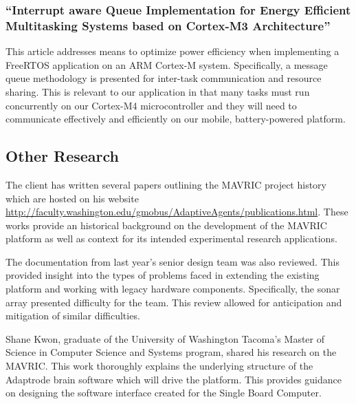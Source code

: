 \documentclass{article}
\begin{document}
            \subsubsection{``Interrupt aware Queue Implementation
            for Energy Efficient Multitasking Systems based
            on Cortex-M3 Architecture''
            \cite{cortex}}

                This article addresses means to optimize power efficiency
                when implementing a FreeRTOS application on an ARM Cortex-M system.
                Specifically, a message queue methodology is presented
                for inter-task communication and resource sharing.
                This is relevant to our application
                in that many tasks must run concurrently
                on our Cortex-M4 microcontroller
                and they will need to communicate effectively
                and efficiently on our mobile, battery-powered platform.

        \subsection{Other Research}
        
            The client has written several papers outlining the MAVRIC project history
            which are hosted on his website
            \url{http://faculty.washington.edu/gmobus/AdaptiveAgents/publications.html}.
            These works provide an historical background on the development
            of the MAVRIC platform
            as well as context for its intended experimental research applications.
            
            The documentation from last year's senior design team
            was also reviewed.\cite{mobot}
            This provided insight into the types of problems faced
            in extending the existing platform
            and working with legacy hardware components.
            Specifically, the sonar array presented difficulty for the team.
            This review allowed for anticipation and mitigation of similar difficulties.
            
            Shane Kwon, graduate of the University of Washington Tacoma's
            Master of Science in Computer Science and Systems program,
            shared his research on the MAVRIC.\cite{shane}
            This work thoroughly explains the underlying structure
            of the Adaptrode brain software which will drive the platform.
            This provides guidance on designing the software interface
            created for the Single Board Computer.
            
\end{document}

